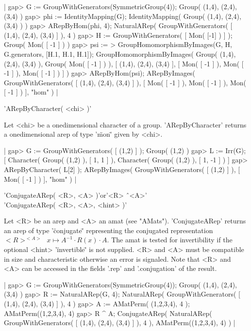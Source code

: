 |    gap> G := GroupWithGenerators(SymmetricGroup(4));
    Group( (1,4), (2,4), (3,4) )
    gap> phi := IdentityMapping(G);
    IdentityMapping( Group( (1,4), (2,4), (3,4) ) )
    gap> ARepByHom(phi, 4);
    NaturalARep( GroupWithGenerators( [ (1,4), (2,4), (3,4) ] ), 4 )
    gap> H := GroupWithGenerators( [ Mon( [-1] ) ] );
    Group( Mon( [ -1 ] ) )
    gap> psi := 
    > GroupHomomorphismByImages(G, H, G.generators, [H.1, H.1, H.1]);
    GroupHomomorphismByImages( 
      Group( (1,4), (2,4), (3,4) ), 
      Group( Mon( [ -1 ] ) ), 
      [ (1,4), (2,4), (3,4) ], 
      [ Mon( [ -1 ] ), Mon( [ -1 ] ), Mon( [ -1 ] ) ] )
    gap> ARepByHom(psi);
    ARepByImages(
      GroupWithGenerators( [ (1,4), (2,4), (3,4) ] ),
      [ Mon( [ -1 ] ),
        Mon( [ -1 ] ),
        Mon( [ -1 ] )
      ],
      "hom"
    ) |


'ARepByCharacter( <chi> )'

Let <chi> be a onedimensional character of a group. 
'ARepByCharacter' returns a onedimensional arep of 
type '\"mon\"' given by <chi>.

|    gap> G := GroupWithGenerators( [ (1,2) ] );
    Group( (1,2) )
    gap> L := Irr(G);
    [ Character( Group( (1,2) ), [ 1, 1 ] ), 
      Character( Group( (1,2) ), [ 1, -1 ] ) ]
    gap> ARepByCharacter( L[2] );
    ARepByImages(
      GroupWithGenerators( [ (1,2) ] ),
      [ Mon( [ -1 ] ) ],
      "hom"
    ) |


'ConjugateARep( <R>, <A> )'\quad or\quad '<R> \^\ <A>'\\
'ConjugateARep( <R>, <A>, <hint> )'

Let <R> be an arep and <A> an amat (see "AMats"). 
'ConjugateARep' returns an arep of type '\"conjugate\"' 
representing the conjugated representation 
$<R>^{<A>}\:\ x\mapsto A^{-1}\cdot R(x)\cdot A$. The amat
is tested for invertibility if the optional <hint> 
'\"invertible\"' is not supplied. <R> and <A> must be compatible 
in size and characteristic otherwise an error is signaled.
Note that <R> and <A> can be accessed in the fields '.rep'
and '.conjugation' of the result.

|    gap> G := GroupWithGenerators(SymmetricGroup(4));
    Group( (1,4), (2,4), (3,4) )
    gap> R := NaturalARep(G, 4);
    NaturalARep( GroupWithGenerators( [ (1,4), (2,4), (3,4) ] ), 4 )
    gap> A := AMatPerm( (1,2,3,4), 4 );
    AMatPerm((1,2,3,4), 4)
    gap> R ^ A;
    ConjugateARep(
      NaturalARep( GroupWithGenerators( [ (1,4), (2,4), (3,4) ] ), 4 ),
      AMatPerm((1,2,3,4), 4)
    ) |

